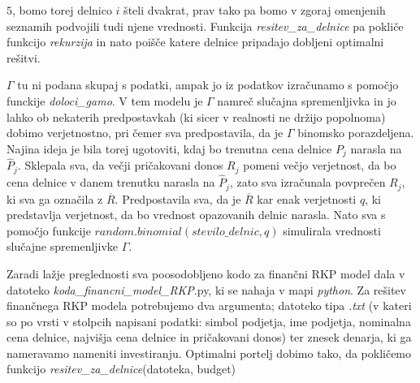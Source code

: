 \documentclass[a4paper,12pt]{article}
\theoremstyle{definition}
\begin{document}
$5$, bomo torej delnico $i$ šteli dvakrat, prav tako pa bomo v zgoraj omenjenih seznamih
podvojili tudi njene vrednosti. Funkcija \textit{resitev\_za\_delnice} pa pokliče funkcijo \textit{rekurzija}
in nato poišče katere delnice pripadajo dobljeni optimalni rešitvi.
\par
$\Gamma$ tu ni podana skupaj s podatki, ampak jo iz podatkov izračunamo s pomočjo funckije \textit{doloci\_gamo}.
V tem modelu je $\Gamma$ namreč slučajna spremenljivka in jo lahko ob nekaterih predpostavkah (ki 
sicer v realnosti ne držijo popolnoma) dobimo verjetnostno, pri čemer sva predpostavila, da je $\Gamma$
binomsko porazdeljena. Najina ideja je bila torej ugotoviti, kdaj bo trenutna cena delnice $P_j$ narasla na 
$\hat{P}_j$. Sklepala sva, da večji pričakovani donos $R_j$ pomeni večjo verjetnost, da
bo cena delnice v danem trenutku narasla na $\hat{P}_j$, zato sva izračunala povprečen $R_j$, ki
sva ga označila z $\overline{R}$. 
Predpostavila sva, da je $\overline{R}$ kar enak verjetnosti $q$, ki predstavlja verjetnost,
da bo vrednost opazovanih delnic narasla. Nato sva s pomočjo funkcije $random.binomial(stevilo\_delnic, q)$ 
simulirala vrednosti slučajne spremenljivke $\Gamma$.
\par
Zaradi lažje preglednosti sva poosodobljeno kodo za finančni RKP model dala v datoteko
\textit{koda\_financni\_model\_RKP}.py, ki se nahaja v mapi \textit{python}. 
Za rešitev finančnega RKP modela potrebujemo dva argumenta; datoteko tipa \textit{.txt} (v kateri
so po vrsti v stolpcih napisani podatki: simbol podjetja, ime podjetja, nominalna cena delnice, 
najvišja cena delnice in pričakovani donos) ter znesek denarja, ki ga nameravamo nameniti investiranju.
Optimalni portelj dobimo tako, da pokličemo funkcijo \textit{resitev\_za\_delnice}(datoteka, budget)
\end{document}
